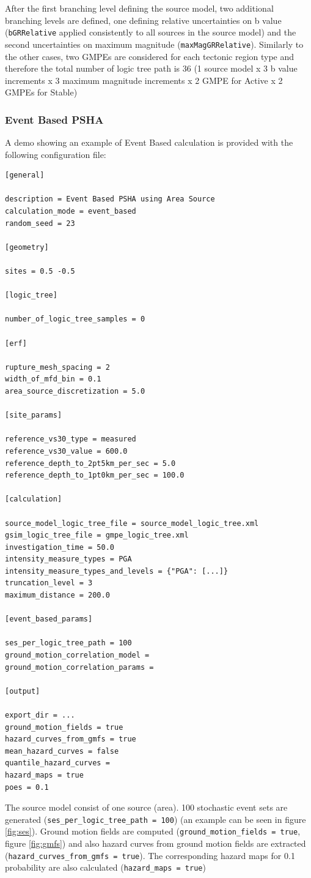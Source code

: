 After the first branching level defining the source model, two 
additional branching levels are defined, one defining
relative uncertainties on b value (\texttt{bGR\-Rel\-a\-tive} applied 
consistently to all sources in the source model)
and the second uncertainties on maximum magnitude (\texttt{maxMagGRRelative}). 
Similarly to the other cases, two GMPEs are considered for each tectonic 
region type and therefore the total number of logic tree path is 36
(1 source model x 3 b value increments x 3 maximum magnitude increments 
x 2 GMPE for Active x 2 GMPEs for Stable)

\subsubsection{Event Based PSHA}
A demo showing an example of Event Based calculation is provided with the 
following configuration file:
\begin{Verbatim}[frame=single, commandchars=\\\{\}, fontsize=\normalsize]
[general]

description = Event Based PSHA using Area Source
calculation_mode = event_based
random_seed = 23

[geometry]

sites = 0.5 -0.5

[logic_tree]

number_of_logic_tree_samples = 0

[erf]

rupture_mesh_spacing = 2
width_of_mfd_bin = 0.1
area_source_discretization = 5.0

[site_params]

reference_vs30_type = measured
reference_vs30_value = 600.0
reference_depth_to_2pt5km_per_sec = 5.0
reference_depth_to_1pt0km_per_sec = 100.0

[calculation]

source_model_logic_tree_file = source_model_logic_tree.xml
gsim_logic_tree_file = gmpe_logic_tree.xml
investigation_time = 50.0
intensity_measure_types = PGA
intensity_measure_types_and_levels = {"PGA": [...]}
truncation_level = 3
maximum_distance = 200.0

[event_based_params]

ses_per_logic_tree_path = 100
ground_motion_correlation_model =
ground_motion_correlation_params =

[output]

export_dir = ...
ground_motion_fields = true
hazard_curves_from_gmfs = true
mean_hazard_curves = false
quantile_hazard_curves =
hazard_maps = true
poes = 0.1
\end{Verbatim}
The source model consist of one source (area). 100 stochastic event sets 
are generated (\texttt{ses\_\-per\_\-logic\_\-tree\_\-path = 100}) (an 
example can be seen in figure \ref{fig:ses}). Ground motion fields are 
computed (\texttt{ground\_\-motion\_\-fields = true}, figure \ref{fig:gmfs}) 
and also hazard curves from ground motion fields are
extracted (\texttt{hazard\_\-curves\_\-from\_\-gmfs = true}).
The corresponding hazard maps for 0.1 probability are also calculated
(\texttt{hazard\_\-maps = true})

